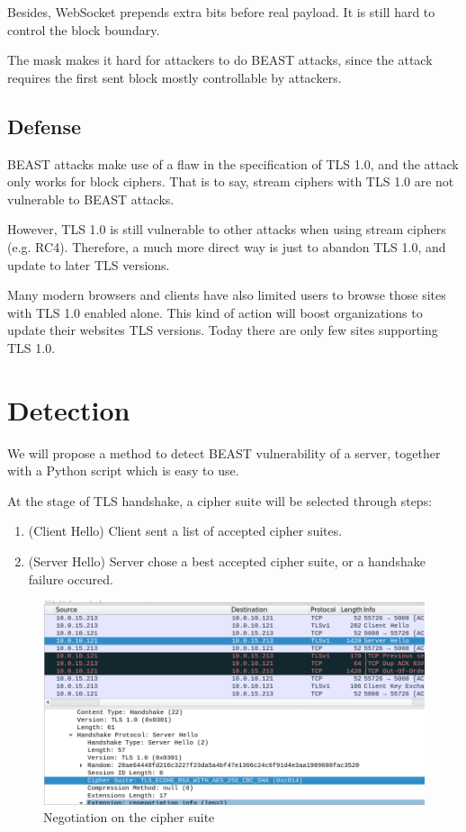 \documentclass{acm_proc_article-sp}
\begin{document}
Besides, WebSocket prepends extra bits before real payload. It is still hard to
control the block boundary.

The mask makes it hard for attackers to do BEAST attacks, since the attack requires
the first sent block mostly controllable by attackers.

\subsection{Defense}
BEAST attacks make use of a flaw in the specification of TLS 1.0, and the attack only
works for block ciphers. That is to say, stream ciphers with TLS 1.0 are not
vulnerable to BEAST attacks.

However, TLS 1.0 is still vulnerable to other attacks when using stream ciphers (e.g. RC4).
Therefore, a much more direct way is just to abandon TLS 1.0, and update to later TLS
versions.

Many modern browsers and clients have also limited users to browse those sites
with TLS 1.0 enabled alone. This kind of action will boost organizations to update their
websites TLS versions. Today there are only few sites supporting TLS 1.0.

\section{Detection}

We will propose a method to detect BEAST vulnerability of a server, together with a
Python script which is easy to use.

At the stage of TLS handshake, a cipher suite will be selected through steps:

\begin{enumerate}
    \item (Client Hello) Client sent a list of accepted cipher suites.
    \item (Server Hello) Server chose a best accepted cipher suite, or a handshake failure occured.
\end{enumerate}

\begin{figure}[htb]
    \centering
    \includegraphics[keepaspectratio, width=\linewidth]{./figures/tls-handshake-cipher-spec.png}
    \caption{Negotiation on the cipher suite}
\end{figure}
\end{document}
